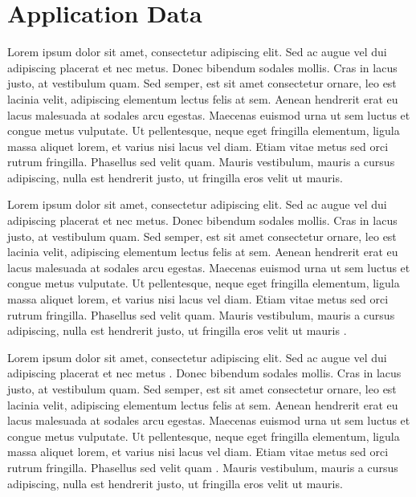 \section{Application Data}

Lorem ipsum dolor sit amet, consectetur adipiscing elit. Sed ac augue vel dui 
adipiscing placerat et nec metus. Donec bibendum sodales mollis. Cras in lacus 
justo, at vestibulum quam. Sed semper, est sit amet consectetur ornare, leo est 
lacinia velit, adipiscing elementum lectus felis at sem. Aenean hendrerit erat eu 
lacus malesuada at sodales arcu egestas. Maecenas euismod urna ut sem luctus et 
congue metus vulputate. Ut pellentesque, neque eget fringilla elementum, ligula 
massa aliquet lorem, et varius nisi lacus vel diam. Etiam vitae metus sed orci 
rutrum fringilla. Phasellus sed velit quam. Mauris vestibulum, mauris a cursus 
adipiscing, nulla est hendrerit justo, ut fringilla eros velit ut mauris.

Lorem ipsum dolor sit amet, consectetur adipiscing elit. Sed ac augue vel dui 
adipiscing placerat et nec metus. Donec bibendum sodales mollis. Cras in lacus 
justo, at vestibulum quam. Sed semper, est sit amet consectetur ornare, leo est 
lacinia velit, adipiscing elementum lectus felis at sem. Aenean hendrerit erat eu 
lacus malesuada at sodales arcu egestas. Maecenas euismod urna ut sem luctus et 
congue metus vulputate. Ut pellentesque, neque eget fringilla elementum, ligula 
massa aliquet lorem, et varius nisi lacus vel diam. Etiam vitae metus sed orci 
rutrum fringilla. Phasellus sed velit quam. Mauris vestibulum, mauris a cursus 
adipiscing, nulla est hendrerit justo, ut fringilla eros velit ut mauris
.


Lorem ipsum dolor sit amet, consectetur adipiscing elit. Sed ac augue vel dui 
adipiscing placerat et nec metus . 
Donec bibendum sodales mollis. Cras in lacus 
justo, at vestibulum quam. Sed semper, est sit amet consectetur ornare, leo est 
lacinia velit, adipiscing elementum lectus felis at sem. Aenean hendrerit erat eu 
lacus malesuada at sodales arcu egestas. Maecenas euismod urna ut sem luctus et 
congue metus vulputate. Ut pellentesque, neque eget fringilla elementum, ligula 
massa aliquet lorem, et varius nisi lacus vel diam. Etiam vitae metus sed orci 
rutrum fringilla. Phasellus sed velit quam . 
Mauris vestibulum, mauris a cursus 
adipiscing, nulla est hendrerit justo, ut fringilla eros velit ut mauris.

